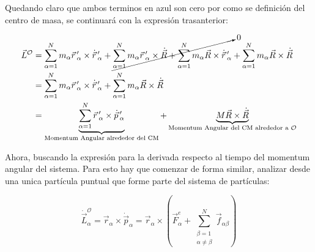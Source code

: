 \documentclass[/home/hernan/Documentos/Apuntes_mecanica_teorica/main.tex]{subfiles}
\begin{document}
	Quedando claro que ambos terminos en azul son cero por como se definición del centro de masa, se continuará con la expresión trasanterior:

	\begin{align*}
		\vec{L}^{\mathcal{O}} &= \sum_{\alpha =1}^{N} m_{\alpha} {\vec{r}}\,'_{\alpha} \times {\dot{\vec{r}}}\,'_{\alpha} + \cancelto{0}{\sum_{\alpha =1}^{N} m_{\alpha} {\vec{r}}\,'_{\alpha} \times \dot{\vec{R}} + \sum_{\alpha =1}^{N} m_{\alpha} \vec{R} \times {\dot{\vec{r}}}\,'_{\alpha}} + \sum_{\alpha =1}^{N} m_{\alpha}  \vec{R} \times \dot{\vec{R}} \\ 
		& = \sum_{\alpha =1}^{N} m_{\alpha} {\vec{r}}\,'_{\alpha} \times {\dot{\vec{r}}}\,'_{\alpha} + \sum_{\alpha =1}^{N} m_{\alpha}  \vec{R} \times \dot{\vec{R}} \\ 
		& = \underbrace{\sum_{\alpha =1}^{N} {\vec{r}}\,'_{\alpha} \times {\dot{\vec{p}}}\,'_{\alpha}}_{\textup{Momentum Angular alrededor del CM}} + \underbrace{M \vec{R} \times \dot{\vec{R}}}_{\textup{Momentum Angular del CM alrededor a $\mathcal{O}$}}
	\end{align*}

	Ahora, buscando la expresión para la derivada respecto al tiempo del momentum angular del sistema. Para esto hay que comenzar de forma similar, analizar desde una unica partícula puntual que forme parte del sistema de partículas:

	\begin{equation*}
		\dot{\vec{L}}_{\alpha}^{\mathcal{O}} = \vec{r}_{\alpha} \times \dot{\vec{p}}_{\alpha} = \vec{r}_{\alpha} \times \left(\vec{F}_{\alpha}^{e} + \sum_{\left . \begin{matrix} \beta = 1\\ \alpha \neq \beta \end{matrix} \right .}^{N} \vec{f}_{\alpha \beta}\right)
	\end{equation*}
\end{document}
